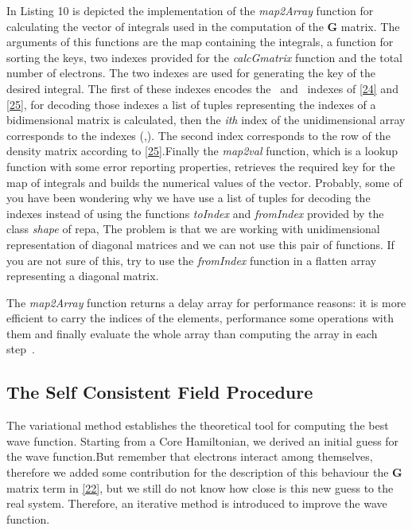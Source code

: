 \documentclass{tmr}
\begin{document}
In Listing 10 is depicted the implementation of the \textit{map2Array} function for
calculating the vector of integrals used in the computation of the \textbf{G} matrix. The
arguments of this functions are the map containing the integrals, a function 
for sorting the keys, two indexes provided for the \textit{calcGmatrix} function
and the total number of electrons. The two indexes are used for generating
the key of the desired integral. The first of these indexes encodes the \textalpha\ and 
\textbeta\ indexes of \eqref{24} and \eqref{25}, for decoding those indexes a list
of tuples representing the indexes of a bidimensional matrix is calculated,
then the \textit{ith} index of the unidimensional array corresponds to the indexes (\textalpha,\textbeta).
The second index corresponds to the row of the density matrix according to \eqref{25}.Finally
the \textit{map2val} function, which is a lookup function with some error reporting properties, 
retrieves the required key for the map of integrals and builds the numerical values of the vector.
Probably, some of you have been wondering why we have use a list of tuples for decoding 
the indexes instead of using the functions \textit{toIndex} and \textit{fromIndex}
provided by the class \textit{shape} of repa, The problem is that we are working with
unidimensional representation of diagonal matrices and we can not use this pair of functions.
If you are not sure of this, try to use the \textit{fromIndex} function in a flatten array representing
a diagonal matrix.

The \textit{map2Array} function returns a delay array for performance reasons: it is more efficient
to carry the indices of the elements, performance some operations with them and finally
evaluate the whole array than computing the array in each step~\cite{fusion}.

\subsection{The Self Consistent Field Procedure}

The variational method establishes the theoretical tool for computing the best
wave function. Starting from a Core Hamiltonian, we derived an initial guess
for the wave function.But remember that electrons interact among themselves,
therefore we added some contribution for the description of this behaviour
the \textbf{G} matrix term in \eqref{22}, but we still do not know how
close is this new guess to the real system. Therefore, an iterative method
is introduced to improve the wave function.
\end{document}
